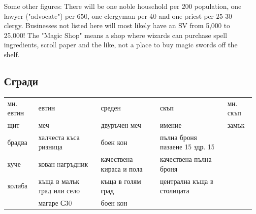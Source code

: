 Some other figures: There will be one noble household per 200 population, one lawyer ("advocate") per 650, one clergyman per 40 and one priest per 25-30 clergy. Businesses not listed here will most likely have an SV from 5,000 to 25,000! The "Magic Shop" means a shop where wizards can purchase spell ingredients, scroll paper and the like, not a place to buy magic swords off the shelf. 

\subsection{Сгради}
\begin{tabular}{p{3cm} | p{3cm} | p{3cm} | p{3cm} | p{3cm}}
мн. евтин & евтин                                   & среден                   & скъп                           & мн. скъп  \\
щит       & меч                                     & двуръчен меч             & имение                         & замък     \\
брадва    & халчеста къса ризница                   & боен кон                 & пълна броня пазаене 15 здр. 15 &           \\
куче      & кован нагръдник                         & качествена кираса и пола & качествена пълна броня         &           \\
колиба    & къща в малък град или село              & къща в голям град        & централна къща в столицата                 \\
          & магаре С30                              & боен кон                 &
\end{tabular}

